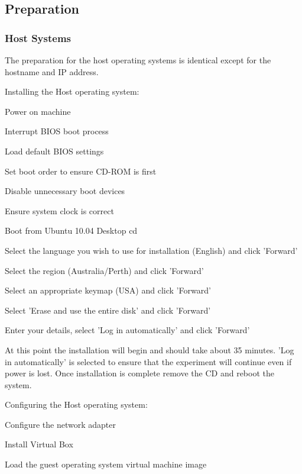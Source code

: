 \subsection{Preparation}

\subsubsection{Host Systems}

The preparation for the host operating systems is identical except for the hostname and IP address.

Installing the Host operating system:

\begin{enumerate*}
  \item Power on machine
  \item Interrupt BIOS boot process
  \begin{enumerate*}
    \item Load default BIOS settings
    \item Set boot order to ensure CD-ROM is first
    \item Disable unnecessary boot devices
    \item Ensure system clock is correct
  \end{enumerate*}
  \item Boot from Ubuntu 10.04 Desktop cd
  \item Select the language you wish to use for installation (English) and click 'Forward'
  \item Select the region (Australia/Perth) and click 'Forward'
  \item Select an appropriate keymap (USA) and click 'Forward'
  \item Select 'Erase and use the entire disk' and click 'Forward'
  \item Enter your details, select 'Log in automatically' and click 'Forward'
\end{enumerate*}

At this point the installation will begin and should take about 35 minutes. 'Log in automatically' is selected to ensure that the experiment will continue even if power is lost. Once installation is complete remove the CD and reboot the system.

Configuring the Host operating system:

\begin{enumerate*}
  \item Configure the network adapter
  \item Install Virtual Box
  \item Load the guest operating system virtual machine image
\end{enumerate*}

